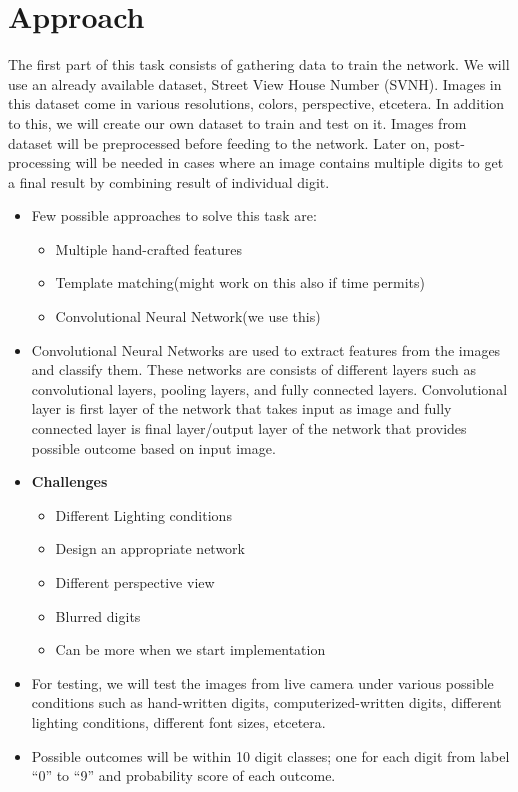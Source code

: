 \documentclass[12pt, letterpaper]{article}
\begin{document}
\section{Approach}
The first part of this task consists of gathering data to train the network. We will use an already available dataset, Street View House Number (SVNH)\cite{Reading Digits in Natural Images
	with Unsupervised Feature Learning}. Images in this dataset come in various resolutions, colors, perspective, etcetera. In addition to this, we will create our own dataset to train and test on it. 
Images from dataset will be preprocessed before feeding to the network. Later on, post-processing will be needed in cases where an image contains multiple digits to get a final result by combining result of individual digit. 
\begin{itemize}
	\item Few possible approaches to solve this task are:
		\begin{itemize}
			\item Multiple hand-crafted features
			\item Template matching(might work on this also if time permits)
			\item Convolutional Neural Network(we use this)
		\end{itemize}
	\item Convolutional Neural Networks are used to extract features
	from the images and classify them. These networks are consists of different layers such as convolutional layers, pooling layers, and fully connected layers. Convolutional layer is first layer of the network that takes input as image and fully connected layer is final layer/output layer of the network that provides possible outcome based on input image.
	\item  \textbf{Challenges}
		\begin{itemize}
			\item Different Lighting conditions
			\item Design an appropriate network
			\item Different perspective view
			\item Blurred digits 
			\item Can be more when we start implementation
			
		\end{itemize}
	\item For testing, we will test the images from live camera under various possible conditions such as hand-written digits, computerized-written digits, different lighting conditions, different font sizes, etcetera.
	\item Possible outcomes will be within 10 digit classes; one for each digit from label ``0'' to ``9'' and probability score of each outcome.
\end{itemize}
\end{document}
